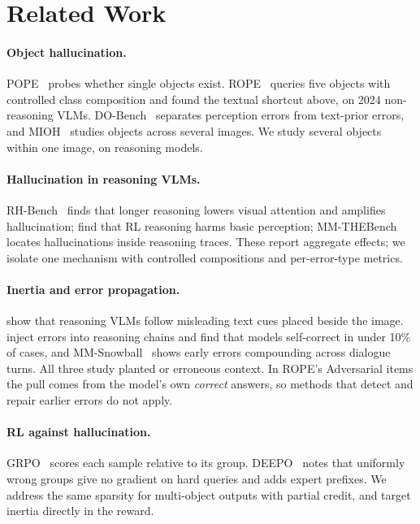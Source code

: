 \documentclass[11pt]{article}
\begin{document}
\section{Related Work}

\paragraph{Object hallucination.} POPE~\citep{li2023pope} probes whether single objects exist. ROPE~\citep{chen2024rope} queries five objects with controlled class composition and found the textual shortcut above, on 2024 non-reasoning VLMs. DO-Bench~\citep{wang2026dobench} separates perception errors from text-prior errors, and MIOH~\citep{min2026mioh} studies objects across several images. We study several objects within one image, on reasoning models.

\paragraph{Hallucination in reasoning VLMs.} RH-Bench~\citep{liu2025morethinking} finds that longer reasoning lowers visual attention and amplifies hallucination; \citet{tian2026vapo} find that RL reasoning harms basic perception; MM-THEBench~\citep{huang2026mmthebench} locates hallucinations inside reasoning traces. These report aggregate effects; we isolate one mechanism with controlled compositions and per-error-type metrics.

\paragraph{Inertia and error propagation.} \citet{sanchezvillegas2026reasoning} show that reasoning VLMs follow misleading text cues placed beside the image. \citet{zhu2026textualinertia} inject errors into reasoning chains and find that models self-correct in under 10\% of cases, and MM-Snowball~\citep{jiang2026mmsnowball} shows early errors compounding across dialogue turns. All three study planted or erroneous context. In ROPE's Adversarial items the pull comes from the model's own \emph{correct} answers, so methods that detect and repair earlier errors do not apply.

\paragraph{RL against hallucination.} GRPO~\citep{shao2024deepseekmath} scores each sample relative to its group. DEEPO~\citep{zhuang2026deepo} notes that uniformly wrong groups give no gradient on hard queries and adds expert prefixes. We address the same sparsity for multi-object outputs with partial credit, and target inertia directly in the reward.
\end{document}
